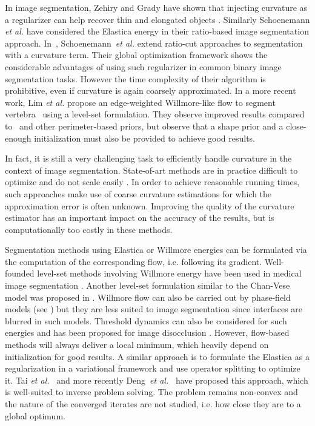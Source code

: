 \documentclass[smallextended]{svjour3}       %
\begin{document}
In image segmentation, Zehiry and Grady have shown that injecting
curvature as a regularizer can help recover thin and elongated objects
\cite{zehiry10fast}. Similarly Schoenemann {\em et al.}
\cite{schoenemann09linear} have considered the Elastica energy in
their ratio-based image segmentation
approach. In~\cite{schoenemann2011elastic}, Schoenemann~{\em et al.}
extend ratio-cut approaches to segmentation with a curvature
term. Their global optimization framework shows the considerable
advantages of using such regularizer in common binary image
segmentation tasks.  However the time complexity of their algorithm
is prohibitive, even if curvature is again coarsely
approximated.  In a more recent work, Lim {\em et al.} propose an
edge-weighted Willmore-like flow to segment
vertebra~\cite{lim2012introducing} using a level-set
formulation. They observe improved results compared
to~\cite{caseles97geodesic} and other perimeter-based priors, but
observe that a shape prior and a close-enough initialization must also be
provided to achieve good results.

In fact, it is still a very challenging task to efficiently handle
curvature in the context of image segmentation.  State-of-art methods
are in practice difficult to optimize and do not scale easily
\cite{zehiry10fast,schoenemann09linear,strandmark11globalframework,nieuwenhuis14efficient}. In
order to achieve reasonable running times, such approaches make use of
coarse curvature estimations for which the approximation error is
often unknown. Improving the quality of the curvature estimator has an
important impact on the accuracy of the results, but is
computationally too costly in these methods.

Segmentation methods using Elastica or Willmore energies can be
formulated via the computation of the corresponding flow,
i.e. following its gradient. Well-founded level-set methods involving
Willmore energy \cite{droske2004level} have been used in medical image
segmentation \cite{lim2012introducing}. Another level-set formulation
similar to the Chan-Vese model was proposed in
\cite{zhu2013image}. Willmore flow can also be carried out by
phase-field models (see \cite{bretin2015phase}) but they are less
suited to image segmentation since interfaces are blurred in such
models. Threshold dynamics can also be considered for such energies
\cite{esedoglu2008threshold} and has been proposed for image
disocclusion \cite{esedoglu2005threshold}. However, flow-based methods
will always deliver a local minimum, which heavily depend on
initialization for good results. A similar approach is to formulate
the Elastica as a regularization in a variational framework and use
operator splitting to optimize it. Tai {\em et
  al.}~\cite{tai11elastica} and more recently Deng~{\em et
  al.}~\cite{deng2019new} have proposed this approach, which is
well-suited to inverse problem solving. The problem remains non-convex
and the nature of the converged iterates are not studied, i.e. how
close they are to a global optimum.
\end{document}
